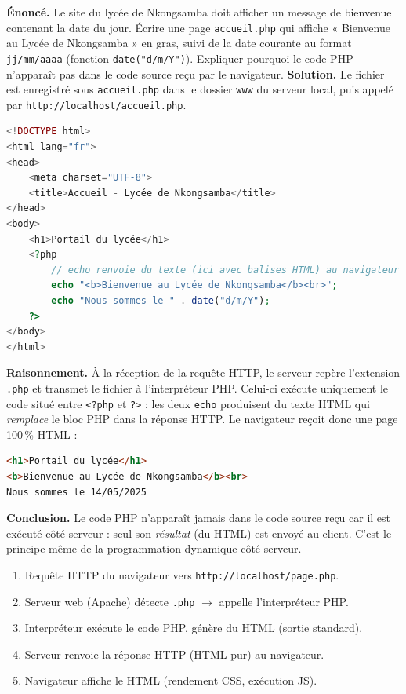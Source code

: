 \documentclass[11pt]{article}
\begin{document}
\begin{exoresolu}
\textbf{Énoncé.} Le site du lycée de Nkongsamba doit afficher un message de bienvenue contenant la date du jour. Écrire une page \texttt{accueil.php} qui affiche « Bienvenue au Lycée de Nkongsamba » en gras, suivi de la date courante au format \texttt{jj/mm/aaaa} (fonction \texttt{date("d/m/Y")}). Expliquer pourquoi le code PHP n'apparaît pas dans le code source reçu par le navigateur.
\tcblower
\textbf{Solution.} Le fichier est enregistré sous \texttt{accueil.php} dans le dossier \texttt{www} du serveur local, puis appelé par \texttt{http://localhost/accueil.php}.
\begin{lstlisting}[language=Php]
<!DOCTYPE html>
<html lang="fr">
<head>
    <meta charset="UTF-8">
    <title>Accueil - Lycée de Nkongsamba</title>
</head>
<body>
    <h1>Portail du lycée</h1>
    <?php
        // echo renvoie du texte (ici avec balises HTML) au navigateur
        echo "<b>Bienvenue au Lycée de Nkongsamba</b><br>";
        echo "Nous sommes le " . date("d/m/Y");
    ?>
</body>
</html>
\end{lstlisting}
\textbf{Raisonnement.} À la réception de la requête HTTP, le serveur repère l'extension \texttt{.php} et transmet le fichier à l'interpréteur PHP. Celui-ci exécute uniquement le code situé entre \texttt{<?php} et \texttt{?>} : les deux \texttt{echo} produisent du texte HTML qui \emph{remplace} le bloc PHP dans la réponse HTTP. Le navigateur reçoit donc une page 100\,\% HTML :
\begin{lstlisting}[language=HTML]
<h1>Portail du lycée</h1>
<b>Bienvenue au Lycée de Nkongsamba</b><br>
Nous sommes le 14/05/2025
\end{lstlisting}
\textbf{Conclusion.} Le code PHP n'apparaît jamais dans le code source reçu car il est exécuté côté serveur : seul son \emph{résultat} (du HTML) est envoyé au client. C'est le principe même de la programmation dynamique côté serveur.
\end{exoresolu}

\begin{aretenir}
\begin{enumerate}
  \item Requête HTTP du navigateur vers \texttt{http://localhost/page.php}.
  \item Serveur web (Apache) détecte \texttt{.php} $\rightarrow$ appelle l'interpréteur PHP.
  \item Interpréteur exécute le code PHP, génère du HTML (sortie standard).
  \item Serveur renvoie la réponse HTTP (HTML pur) au navigateur.
  \item Navigateur affiche le HTML (rendement CSS, exécution JS).
\end{enumerate}
\end{aretenir}
\end{document}
